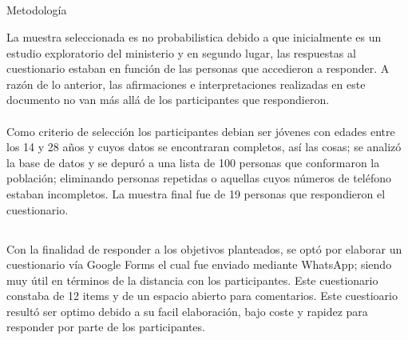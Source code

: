 \documentclass{beamer}
\begin{document}

\subsection{}
\begin{frame}{Metodología}
\vspace{-0.9\baselineskip}
\begin{tcolorbox}[colback=backframe_color,colframe=beamer_color,title= Elección de la muestra] 
La muestra seleccionada es no probabilistica debido a que inicialmente es un estudio exploratorio del ministerio y en segundo lugar, las respuestas al cuestionario estaban en función de las personas que accedieron a responder. A razón de lo anterior, las afirmaciones e interpretaciones realizadas en este documento no van más allá de los participantes que respondieron. 
\\\\
Como criterio de selección los participantes debian ser jóvenes con edades entre los 14 y 28 años y cuyos datos se encontraran completos, así las cosas; se analizó la base de datos  y se depuró a una lista de 100 personas que conformaron la población; eliminando personas repetidas o aquellas cuyos números de teléfono estaban incompletos. La muestra final fue de 19 personas que respondieron el cuestionario. 
\end{tcolorbox}
\end{frame}



\subsection{}
\begin{frame}{}
\vspace{-0.9\baselineskip}
\begin{tcolorbox}[colback=backframe_color,colframe=beamer_color,title= Instrumentos: cuestionario] 
Con la finalidad de responder a los objetivos planteados, se optó por elaborar un cuestionario vía Google Forms el cual fue enviado mediante WhatsApp; siendo muy útil en términos de la distancia con los participantes. Este cuestionario constaba de 12 items y de un espacio abierto para comentarios. Este cuestioario resultó ser optimo debido a su facil elaboración, bajo coste y rapidez para responder por parte de los participantes.
\end{tcolorbox}
\end{frame}
\end{document}
